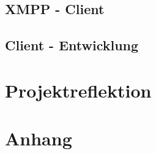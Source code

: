 \documentclass[a4paper]{article}
\begin{document}
\newpage

\subsection{XMPP - Client}

\newpage

\subsection{Client - Entwicklung}

\newpage

\section{Projektreflektion}

\newpage



\section{Anhang}

\listoffigures
\end{document}
